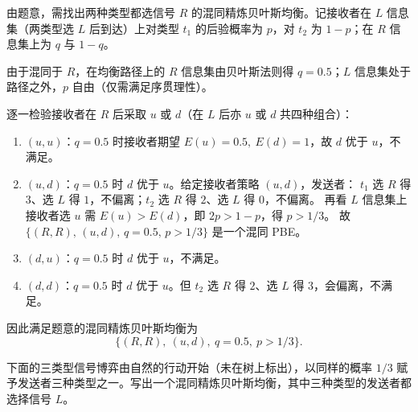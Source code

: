 \sol 由题意，需找出两种类型都选信号 $R$ 的混同精炼贝叶斯均衡。记接收者在 $L$ 信息集（两类型选 $L$ 后到达）上对类型 $t_1$ 的后验概率为 $p$，对 $t_2$ 为 $1-p$；在 $R$ 信息集上为 $q$ 与 $1-q$。

由于混同于 $R$，在均衡路径上的 $R$ 信息集由贝叶斯法则得 $q=0.5$；$L$ 信息集处于路径之外，$p$ 自由（仅需满足序贯理性）。

逐一检验接收者在 $R$ 后采取 $u$ 或 $d$（在 $L$ 后亦 $u$ 或 $d$ 共四种组合）：

\begin{enumerate}[leftmargin=1.8em, label=(\arabic*)]
  \item $(u,u)$：$q=0.5$ 时接收者期望 $E(u)=0.5,\ E(d)=1$，故 $d$ 优于 $u$，不满足。
  \item $(u,d)$：$q=0.5$ 时 $d$ 优于 $u$。给定接收者策略 $(u,d)$，发送者：
    $t_1$ 选 $R$ 得 $3$、选 $L$ 得 $1$，不偏离；$t_2$ 选 $R$ 得 $2$、选 $L$ 得 $0$，不偏离。
    再看 $L$ 信息集上接收者选 $u$ 需 $E(u)>E(d)$，即 $2p>1-p$，得 $p>1/3$。
    故 $\{(R,R),\,(u,d),\,q=0.5,\,p>1/3\}$ 是一个混同 PBE。
  \item $(d,u)$：$q=0.5$ 时 $d$ 优于 $u$，不满足。
  \item $(d,d)$：$q=0.5$ 时 $d$ 优于 $u$。但 $t_2$ 选 $R$ 得 $2$、选 $L$ 得 $3$，会偏离，不满足。
\end{enumerate}

因此满足题意的混同精炼贝叶斯均衡为
\[
  \bigl\{(R,R),\ (u,d),\ q=0.5,\ p>1/3\bigr\}.
\]

下面的三类型信号博弈由自然的行动开始（未在树上标出），以同样的概率 $1/3$ 赋予发送者三种类型之一。写出一个混同精炼贝叶斯均衡，其中三种类型的发送者都选择信号 $L$。


